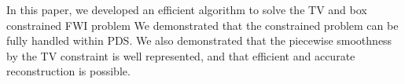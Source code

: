 In this paper, we developed an efficient algorithm to solve the TV and box constrained FWI problem%
We demonstrated that the constrained problem can be fully handled within PDS.
We also demonstrated that the piecewise smoothness by the TV constraint is well represented, and that efficient and accurate reconstruction is possible.


